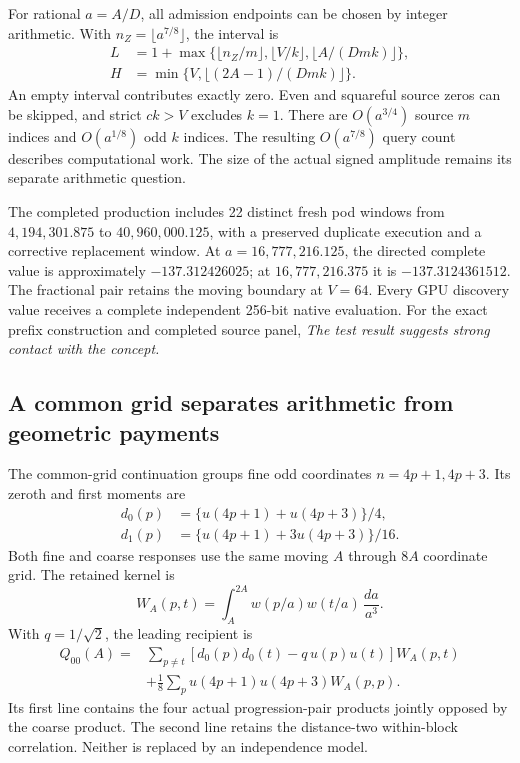 For rational \(a=A/D\), all admission endpoints can be chosen by
integer arithmetic. With \(n_Z=\lfloor a^{7/8}\rfloor\), the interval is
\[
\begin{aligned}
 L&=1+\max\{\lfloor n_Z/m\rfloor,
           \lfloor V/k\rfloor,
           \lfloor A/(Dmk)\rfloor\},\\
 H&=\min\{V,\lfloor(2A-1)/(Dmk)\rfloor\}.
\end{aligned}
\]
An empty interval contributes exactly zero. Even and squareful source
zeros can be skipped, and strict \(ck>V\) excludes \(k=1\).
There are \(O(a^{3/4})\) source \(m\) indices and \(O(a^{1/8})\)
odd \(k\) indices. The resulting \(O(a^{7/8})\) query count describes
computational work. The size of the actual signed amplitude remains
its separate arithmetic question.

The completed production includes 22 distinct fresh pod windows from
\(4{,}194{,}301.875\) to \(40{,}960{,}000.125\), with a preserved
duplicate execution and a corrective replacement window. At
\(a=16{,}777{,}216.125\), the directed complete value is approximately
\(-137.312426025\); at \(16{,}777{,}216.375\) it is
\(-137.3124361512\). The fractional pair retains the moving boundary
at \(V=64\). Every GPU discovery value receives a complete independent
256-bit native evaluation. For the exact prefix construction and
completed source panel, \emph{The test result suggests strong contact
with the concept.}

\subsection{A common grid separates arithmetic from geometric payments}

The common-grid continuation groups fine odd coordinates
\(n=4p+1,4p+3\). Its zeroth and first moments are
\[
\begin{aligned}
 d_0(p)&=\{u(4p+1)+u(4p+3)\}/4,\\
 d_1(p)&=\{u(4p+1)+3u(4p+3)\}/16.
\end{aligned}
\]
Both fine and coarse responses use the same moving \(A\) through
\(8A\) coordinate grid. The retained kernel is
\[
 W_A(p,t)=\int_A^{2A}
       w(p/a)w(t/a)\,\frac{da}{a^3}.
\]
With \(q=1/\sqrt2\), the leading recipient is
\[
\begin{aligned}
 Q_{00}(A)={}&\sum_{p\ne t}
 [d_0(p)d_0(t)-q\,u(p)u(t)]W_A(p,t)\\
 &+\frac18\sum_pu(4p+1)u(4p+3)W_A(p,p).
\end{aligned}
\]
Its first line contains the four actual progression-pair products
jointly opposed by the coarse product. The second line retains the
distance-two within-block correlation. Neither is replaced by an
independence model.

